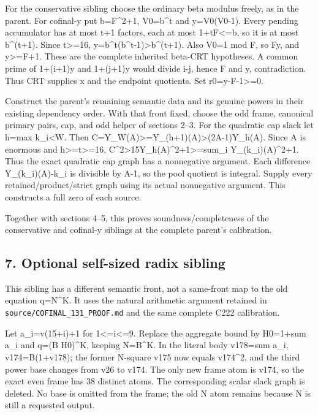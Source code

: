 For the conservative sibling choose the ordinary beta modulus freely, as
in the parent. For cofinal-y put b=F\^{}2+1, V0=b\^{}t and y=V0(V0-1).
Every pending accumulator has at most t+1 factors, each at most
1+tF\textless=b, so it is at most b\^{}(t+1). Since t\textgreater=16,
y=b\^{}t(b\^{}t-1)\textgreater b\^{}(t+1). Also V0=1 mod F, so
F\textbar y, and y\textgreater=F+1. These are the complete inherited
beta-CRT hypotheses. A common prime of 1+(i+1)y and 1+(j+1)y would
divide i-j, hence F and y, contradiction. Thus CRT supplies x and the
endpoint quotients. Set r0=y-F-1\textgreater=0.

Construct the parent's remaining semantic data and its genuine powers in
their existing dependency order. With that front fixed, choose the odd
frame, canonical primary pairs, cap, and odd helper of sections 2--3.
For the quadratic cap slack let h=max k\_i\textless W. Then
C=Y\_W(A)\textgreater=Y\_(h+1)(A)\textgreater(2A-1)Y\_h(A). Since A is
enormous and h\textgreater=t\textgreater=16,
C\^{}2\textgreater15Y\_h(A)\^{}2+1\textgreater=sum\_i
Y\_(k\_i)(A)\^{}2+1. Thus the exact quadratic cap graph has a
nonnegative argument. Each difference Y\_(k\_i)(A)-k\_i is divisible by
A-1, so the pool quotient is integral. Supply every
retained/product/strict graph using its actual nonnegative argument.
This constructs a full zero of each source.

Together with sections 4--5, this proves soundness/completeness of the
conservative and cofinal-y siblings at the complete parent's
calibration.

\subsection{7. Optional self-sized radix
sibling}\label{optional-self-sized-radix-sibling}

This sibling has a different semantic front, not a same-front map to the
old equation q=N\^{}K. It uses the natural arithmetic argument retained
in \texttt{source/COFINAL\_131\_PROOF.md} and the same complete C222
calibration.

Let a\_i=v(15+i)+1 for 1\textless=i\textless=9. Replace the aggregate
bound by H0=1+sum a\_i and q=(B H0)\^{}K, keeping N=B\^{}K. In the
literal body v178=sum a\_i, v174=B(1+v178); the former N-square v175 now
equals v174\^{}2, and the third power base changes from v26 to v174. The
only new frame atom is v174, so the exact even frame has 38 distinct
atoms. The corresponding scalar slack graph is deleted. No base is
omitted from the frame; the old N atom remains because N is still a
requested output.

